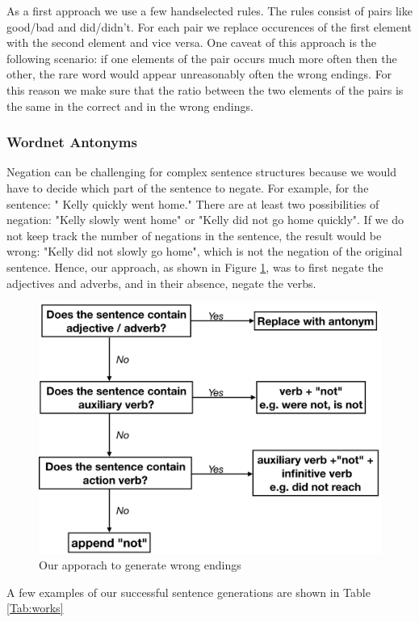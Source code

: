 \documentclass{article}
\begin{document}
As a first approach we use a few handselected rules. The rules consist of pairs like good/bad and did/didn't. For each pair we replace occurences of the first element with the second element and vice versa. One caveat of this approach is the following scenario: if one elements of the pair occurs much more often then the other, the rare word would appear unreasonably often the wrong endings. For this reason we make sure that the ratio between the two elements of the pairs is the same in the correct and in the wrong endings.


\subsubsection{Wordnet Antonyms}

Negation can be challenging for complex sentence structures because we would have to decide which part of the sentence to negate. For example, for the sentence: "
Kelly quickly went home." There are at least two possibilities of negation: "Kelly slowly went home" or "Kelly did not go home quickly". If we do not keep track the number of negations in the sentence, the result would be wrong: "Kelly did not slowly go home", which is not the negation of the original sentence. Hence, our approach, as shown in Figure \ref{Figure:wrong}, was to first negate the adjectives and adverbs, and in their absence, negate the verbs.

\begin{figure}
  \centering
  \includegraphics[width=0.7 \linewidth]{fig/wrong.PNG}
  \caption{Our apporach to generate wrong endings}
  \label{Figure:wrong}
\end{figure}


A few examples of our successful sentence generations are shown in Table \ref{Tab:works}
\end{document}
